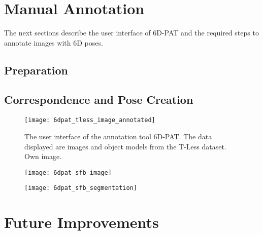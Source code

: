 

\section{Manual Annotation}

The next sections describe the user interface of 6D-PAT and the required steps to annotate images with 6D poses.

\subsection{Preparation}



\subsection{Correspondence and Pose Creation}







\begin{figure}[!tbp]
	\centering
    \texttt{[image: 6dpat\_tless\_image\_annotated]}
    \caption{The user interface of the annotation tool 6D-PAT. The data displayed are images and object models from the T-Less dataset. Own image.}
    \label{fig:6dpat_tless_image_annotated}
\end{figure} 

\begin{figure}[!tbp]
	\centering
    \texttt{[image: 6dpat\_sfb\_image]}
    \caption{}
    \label{fig:6dpat_sfb_image}
\end{figure} 

\begin{figure}[!tbp]
	\centering
    \texttt{[image: 6dpat\_sfb\_segmentation]}
    \caption{}
    \label{fig:6dpat_sfb_segmentation}
\end{figure} 

\section{Future Improvements}



